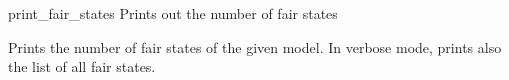 \begin{nusmvCommand}{print\_fair\_states} {Prints out the number of fair states}


Prints the number of fair states of the given model. In verbose mode,
prints also the list of all fair states.

\end{nusmvCommand}
